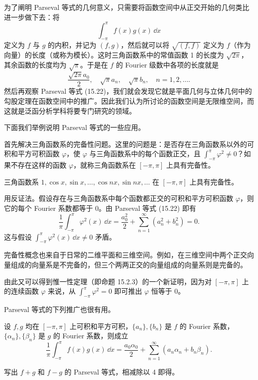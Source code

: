 \begin{xremark}
为了阐明 Parseval 等式的几何意义，只需要将函数空间中从正交开始的几何类比进一步做下去：将
\[
  \int_{-\pi}^{\pi}f(x)g(x)\,\dd x
\]
定义为 $f$ 与 $g$ 的内积，并记为 $(f,g)$，然后就可以将 $\sqrt{(f,f)}$ 定义为 $f$（作为向量）的长度（或称为模长）。这时三角函数系中的常值函数 1 的长度为 $\sqrt{2\pi}$，其余函数的长度均为 $\sqrt\pi$。于是在 $f$ 的 Fourier 级数中各项的长度就是
\[
  \frac{\sqrt{2\pi}a_0}{2},\quad \sqrt\pi a_n,\quad \sqrt\pi b_n,\quad n=1,2,\ldots.
\]
然后再观察 Parseval 等式 (15.22)，我们就会发现它就是平面几何与立体几何中的勾股定理在函数空间中的推广。因此我们认为所讨论的函数空间是无限维空间，而这就是泛函分析学科将要专门研究的领域。
\end{xremark}

下面我们举例说明 Parseval 等式的一些应用。

首先解决三角函数系的完备性问题。这里的问题是：是否存在三角函数系以外的可积和平方可积函数 $\varphi$，使 $\varphi$ 与三角函数系中的每个函数正交，且 $\int_{-\pi}^{\pi}\varphi^2\ne0$？如果不存在这样的函数 $\varphi$，就称三角函数系在 $[-\pi,\pi]$ 上具有完备性。

\begin{xproposition}[15.2.6]
三角函数系 $1,\cos x,\sin x,\ldots,\cos nx,\sin nx,\ldots$ 在 $[-\pi,\pi]$ 上具有完备性。
\end{xproposition}
\begin{xproof}
用反证法。假设存在与三角函数系中每个函数都正交的可积和平方可积函数 $\varphi$，则它的每个 Fourier 系数都等于 0。由 Parseval 等式 (15.22) 即有
\[
  \frac1\pi\int_{-\pi}^{\pi}\varphi^2(x)\,\dd x
  =\frac{a_0^2}{2}+\sum_{n=1}^{\infty}(a_n^2+b_n^2)=0.
\]
这与假设 $\int_{-\pi}^{\pi}\varphi^2(x)\,\dd x\ne0$ 矛盾。
\end{xproof}

\begin{xremark}
完备性概念也来自于日常的二维平面和三维空间。例如，在三维空间中两个正交向量组成的向量系是不完备的，但三个两两正交的向量组成的向量系则是完备的。
\end{xremark}

\begin{xremark}
由此又可以得到惟一性定理（即命题 15.2.3）的一个新证明，因为对 $[-\pi,\pi]$ 上的连续函数 $\varphi$ 来说，从 $\int_{-\pi}^{\pi}\varphi^2=0$ 即可推出 $\varphi$ 恒等于 0。
\end{xremark}

Parseval 等式的下列推广也很有用。

\begin{xproposition}
设 $f,g$ 均在 $[-\pi,\pi]$ 上可积和平方可积，$\{a_n\},\{b_n\}$ 是 $f$ 的 Fourier 系数，$\{\alpha_n\},\{\beta_n\}$ 是 $g$ 的 Fourier 系数，则成立
\begin{equation}
  \frac1\pi\int_{-\pi}^{\pi}f(x)g(x)\,\dd x
  =\frac{a_0\alpha_0}{2}+\sum_{n=1}^{\infty}(a_n\alpha_n+b_n\beta_n).
  \tag{15.23}
  \label{eq:15.23}
\end{equation}
\end{xproposition}
\begin{xproof}
写出 $f+g$ 和 $f-g$ 的 Parseval 等式，相减除以 4 即得。
\end{xproof}

